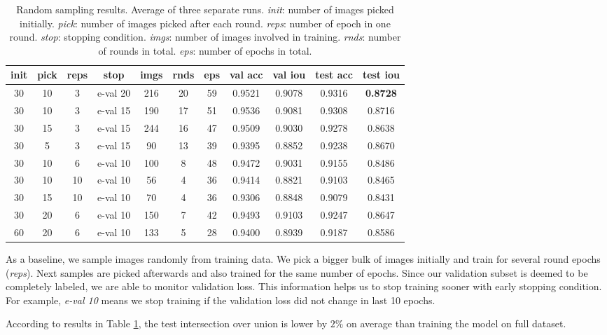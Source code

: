\begin{table}[h]
	\centering
	\begin{tabular}{|c|c|c|c||c|c|c|c|c|c|c|} 
	\hline
	init & pick & reps & stop & imgs & rnds & eps & val acc & val iou & test acc & test iou \\
	\hline
    30 & 10 &  3 & e-val 20 & 216 & 20 & 59 & 0.9521 & 0.9078 & 0.9316 & \textbf{0.8728} \\
    30 & 10 &  3 & e-val 15 & 190 & 17 & 51 & 0.9536 & 0.9081 & 0.9308 & 0.8716 \\
    30 & 15 &  3 & e-val 15 & 244 & 16 & 47 & 0.9509 & 0.9030 & 0.9278 & 0.8638 \\
    30 &  5 &  3 & e-val 15 &  90 & 13 & 39 & 0.9395 & 0.8852 & 0.9238 & 0.8670 \\
    30 & 10 &  6 & e-val 10 & 100 & 8 & 48 & 0.9472 & 0.9031 & 0.9155 & 0.8486 \\
    30 & 10 & 10 & e-val 10 &  56 & 4 & 36 & 0.9414 & 0.8821 & 0.9103 & 0.8465 \\
    30 & 15 & 10 & e-val 10 &  70 & 4 & 36 & 0.9306 & 0.8848 & 0.9079 & 0.8431 \\
    30 & 20 &  6 & e-val 10 & 150 & 7 & 42 & 0.9493 & 0.9103 & 0.9247 & 0.8647 \\
    60 & 20 &  6 & e-val 10 & 133 & 5 & 28 & 0.9400 & 0.8939 & 0.9187 & 0.8586 \\
	\hline
	\end{tabular}
	\caption[Random sampling results.]{Random sampling results. Average of three separate runs.
	\textit{init}: number of images picked initially. \textit{pick}: number of images picked after each round. \textit{reps}: number of
	epoch in one round. \textit{stop}: stopping condition. \textit{imgs}: number of images
	involved in training. \textit{rnds}: number of rounds in total. \textit{eps}: number of epochs
	in total.}
	\label{tab:random_sampling}
\end{table}

As a baseline, we sample images randomly from training data. We pick a bigger bulk of images
initially and train for several round epochs (\textit{reps}). Next samples are picked afterwards
and also trained for the same number of epochs. Since our validation subset is deemed to be
completely labeled, we are able to monitor validation loss. This information helps us
to stop training sooner with early stopping condition. For example, \textit{e-val 10} means
we stop training if the validation loss did not change in last 10 epochs.

According to results in Table \ref{tab:random_sampling}, the test intersection over union
is lower by $2\%$ on average than training the model on full dataset.

